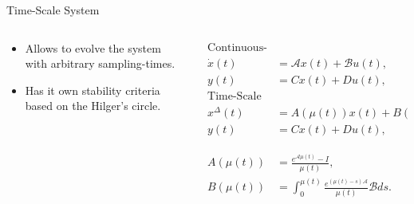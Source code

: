 \begin{slide}{Time-Scale System}
  \begin{columns}[c]
    \begin{column}{0.38\textwidth}
      \begin{itemize}
        \item Allows to evolve the system with arbitrary sampling-times.
        \item Has it own stability criteria based on the Hilger's circle.
      \end{itemize}
    \end{column}%
    \hfill%
    \begin{column}{0.58\textwidth}
      \begin{align}
        \textrm{Continuous-Time System} & \nonumber                                                                 \\
        \dot{x}(t)                      & = \mathcal{A}x(t) + \mathcal{B}u(t),                                      \\
        y(t)                            & = Cx(t) + Du(t),                                                          \\
        \textrm{Time-Scale System}      & \nonumber                                                                 \\
        x^{\Delta}(t)                   & = A(\mu(t))x(t) + B(\mu(t))u(t),                                          \\
        y(t)                            & = Cx(t) + Du(t),                                                          \\
        \phantom{1}                     & \phantom{1}                                 \nonumber                     \\
        A(\mu(t))                       & = \frac{e^{\mathcal{A}\mu(t)}-I}{\mu(t)},                                 \\
        B(\mu(t))                       & = \int_{0}^{\mu(t)}\frac{e^{(\mu(t)-s)\mathcal{A}}}{\mu(t)}\mathcal{B}ds.
      \end{align}
    \end{column}%
  \end{columns}
\end{slide}

